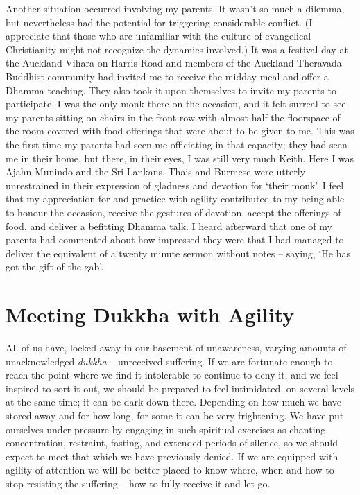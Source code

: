 Another situation occurred involving my parents. It wasn't so much a
dilemma, but nevertheless had the potential for triggering considerable
conflict. (I appreciate that those who are unfamiliar with the culture
of evangelical Christianity might not recognize the dynamics involved.)
It was a festival day at the Auckland Vihara on Harris Road and members
of the Auckland Theravada Buddhist community had invited me to receive
the midday meal and offer a Dhamma teaching. They also took it upon
themselves to invite my parents to participate. I was the only monk
there on the occasion, and it felt surreal to see my parents sitting on
chairs in the front row with almost half the floorspace of the room
covered with food offerings that were about to be given to me. This was
the first time my parents had seen me officiating in that capacity; they
had seen me in their home, but there, in their eyes, I was still very
much Keith. Here I was Ajahn Munindo and the Sri Lankans, Thais and
Burmese were utterly unrestrained in their expression of gladness and
devotion for `their monk'. I feel that my appreciation for and practice
with agility contributed to my being able to honour the occasion,
receive the gestures of devotion, accept the offerings of food, and
deliver a befitting Dhamma talk. I heard afterward that one of my
parents had commented about how impressed they were that I had managed
to deliver the equivalent of a twenty minute sermon without notes --
saying, `He has got the gift of the gab'.

\section{Meeting Dukkha with Agility}

All of us have, locked away in our basement of unawareness, varying
amounts of unacknowledged \emph{dukkha} -- unreceived suffering. If we
are fortunate enough to reach the point where we find it intolerable to
continue to deny it, and we feel inspired to sort it out, we should be
prepared to feel intimidated, on several levels at the same time; it can
be dark down there. Depending on how much we have stored away and for
how long, for some it can be very frightening. We have put ourselves
under pressure by engaging in such spiritual exercises as chanting,
concentration, restraint, fasting, and extended periods of silence, so
we should expect to meet that which we have previously denied. If we are
equipped with agility of attention we will be better placed to know
where, when and how to stop resisting the suffering -- how to fully
receive it and let go.

